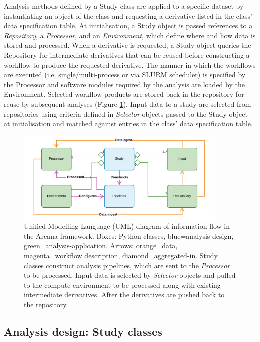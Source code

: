 \documentclass[smallextended]{svjour3}       %
\begin{document}
Analysis methods defined by a Study class are applied to a
specific dataset by instantiating an object of the class and
requesting a derivative listed in the class' data specification table.
At initialisation, a Study object is passed references to a \emph{Repository},
a \emph{Processor}, and an \emph{Environment}, which
define where and how data is stored and processed. When a derivative is
requested, a Study object queries the Repository for intermediate
derivatives that can be reused before constructing a workflow to produce
the requested derivative. The manner in which the workflows are executed
(i.e. single/multi-process or via SLURM scheduler) is specified by the
Processor and software modules required by the analysis are
loaded by the Environment. Selected workflow products are
stored back in the repository for reuse by subsequent analyses (Figure
\ref{fig:simple_uml}). Input data to a study are selected from repositories
 using criteria defined in \emph{Selector} objects passed to the Study
 object at initialisation and matched against entries in the class' data
specification table.

\begin{figure}
    \centering
    \includegraphics[width=0.9\textwidth]{figures/simplified_arcana_uml}
  \caption{Unified Modelling Language (UML) diagram
of information flow in the Arcana framework. Boxes: Python classes,
blue=analysis-design, green=analysis-application. Arrows: orange=data,
magenta=workflow description, diamond=aggregated-in. Study classes
construct analysis pipelines, which are sent to the \emph{Processor} to
be processed. Input data is selected by \emph{Selector} objects and
pulled to the compute environment to be processed along with existing
intermediate derivatives. After the derivatives are pushed back to the
repository.}
\label{fig:simple_uml}
\end{figure}

\subsection*{Analysis design: Study classes}
\label{analysis-design-study-classes}
\end{document}
